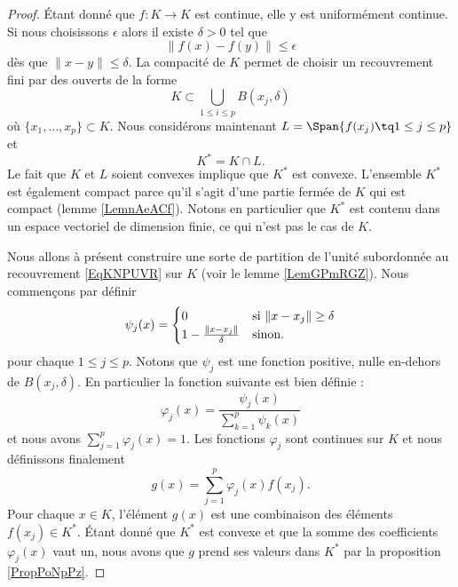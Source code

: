 \begin{proof}
    Étant donné que \( f\colon K\to K\) est continue, elle y est uniformément continue. Si nous choisissons \( \epsilon\) alors il existe \( \delta>0\) tel que 
    \begin{equation}
        \| f(x)-f(y) \|\leq \epsilon
    \end{equation}
    dès que \( \| x-y \|\leq \delta\). La compacité de \( K\) permet de choisir un recouvrement fini par des ouverts de la forme
    \begin{equation}    \label{EqKNPUVR}
        K\subset \bigcup_{1\leq i\leq p}B(x_j,\delta)
    \end{equation}
    où \( \{ x_1,\ldots, x_p \}\subset K\). Nous considérons maintenant \( L=\Span\{ f(x_j)\tq 1\leq j\leq p \}\) et
    \begin{equation}
        K^*=K\cap L.
    \end{equation}
    Le fait que \( K\) et \( L\) soient convexes implique que \( K^*\) est convexe. L'ensemble \( K^*\) est également compact parce qu'il s'agit d'une partie fermée de \( K\) qui est compact (lemme \ref{LemnAeACf}). Notons en particulier que \( K^*\) est contenu dans un espace vectoriel de dimension finie, ce qui n'est pas le cas de \( K\).

    Nous allons à présent construire une sorte de partition de l'unité subordonnée au recouvrement \eqref{EqKNPUVR} sur \( K\) (voir le lemme \ref{LemGPmRGZ}). Nous commençons par définir
    \begin{equation}
        \psi_j(x)=\begin{cases}
            0    &   \text{si \( \| x-x_j \|\geq \delta\)}\\
            1-\frac{ \| x-x_j \| }{ \delta }    &    \text{sinon}.
        \end{cases}
    \end{equation}
    pour chaque \( 1\leq j\leq p\). Notons que \( \psi_j\) est une fonction positive, nulle en-dehors de \( B(x_j,\delta)\). En particulier la fonction suivante est bien définie :
    \begin{equation}
        \varphi_j(x)=\frac{ \psi_j(x) }{ \sum_{k=1}^p\psi_k(x) }
    \end{equation}
    et nous avons \( \sum_{j=1}^p\varphi_j(x)=1\). Les fonctions \( \varphi_j\) sont continues sur \( K\) et nous définissons finalement
    \begin{equation}
        g(x)=\sum_{j=1}^p\varphi_j(x)f(x_j).
    \end{equation}
    Pour chaque \( x\in K\), l'élément \( g(x)\) est une combinaison des éléments \( f(x_j)\in K^*\). Étant donné que \( K^*\) est convexe et que la somme des coefficients \( \varphi_j(x)\) vaut un, nous avons que \( g\) prend ses valeurs dans \( K^*\) par la proposition \ref{PropPoNpPz}.


\end{proof}
